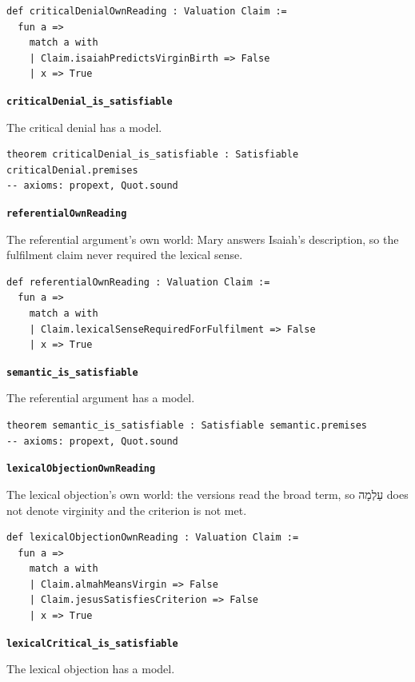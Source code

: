 \documentclass[11pt]{article}
\begin{document}
{\small\begin{verbatim}
def criticalDenialOwnReading : Valuation Claim :=
  fun a =>
    match a with
    | Claim.isaiahPredictsVirginBirth => False
    | x => True
\end{verbatim}}
\par\medskip\noindent\textbf{\texttt{critical\allowbreak{}Denial\_\allowbreak{}is\_\allowbreak{}satisfiable}}\par\nobreak\noindent
The critical denial has a model.

{\small\begin{verbatim}
theorem criticalDenial_is_satisfiable : Satisfiable criticalDenial.premises
-- axioms: propext, Quot.sound
\end{verbatim}}
\par\medskip\noindent\textbf{\texttt{referential\allowbreak{}Own\allowbreak{}Reading}}\par\nobreak\noindent
The referential argument’s own world: Mary answers Isaiah’s description, so the fulfilment claim never required the lexical sense.

{\small\begin{verbatim}
def referentialOwnReading : Valuation Claim :=
  fun a =>
    match a with
    | Claim.lexicalSenseRequiredForFulfilment => False
    | x => True
\end{verbatim}}
\par\medskip\noindent\textbf{\texttt{semantic\_\allowbreak{}is\_\allowbreak{}satisfiable}}\par\nobreak\noindent
The referential argument has a model.

{\small\begin{verbatim}
theorem semantic_is_satisfiable : Satisfiable semantic.premises
-- axioms: propext, Quot.sound
\end{verbatim}}
\par\medskip\noindent\textbf{\texttt{lexical\allowbreak{}Objection\allowbreak{}Own\allowbreak{}Reading}}\par\nobreak\noindent
The lexical objection’s own world: the versions read the broad term, so עַלְמָה does not denote virginity and the criterion is not met.

{\small\begin{verbatim}
def lexicalObjectionOwnReading : Valuation Claim :=
  fun a =>
    match a with
    | Claim.almahMeansVirgin => False
    | Claim.jesusSatisfiesCriterion => False
    | x => True
\end{verbatim}}
\par\medskip\noindent\textbf{\texttt{lexical\allowbreak{}Critical\_\allowbreak{}is\_\allowbreak{}satisfiable}}\par\nobreak\noindent
The lexical objection has a model.
\end{document}
